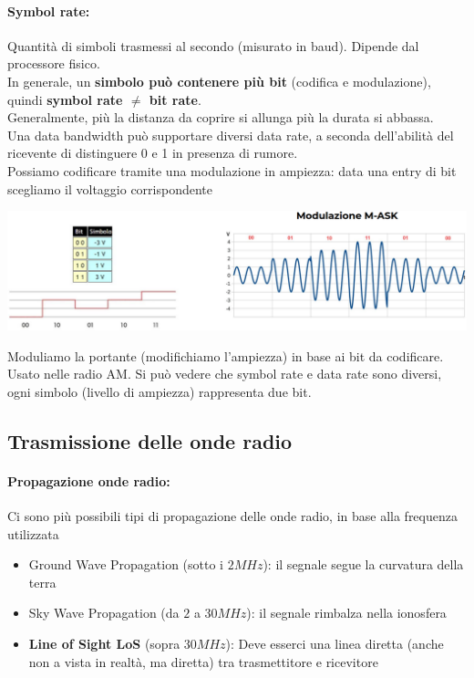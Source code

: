 \paragraph{Symbol rate:} Quantità di simboli trasmessi al secondo (misurato in baud). Dipende dal processore fisico.\\

In generale, un \textbf{simbolo può contenere più bit} (codifica e modulazione), quindi \textbf{symbol rate $\neq$ bit rate}.\\
Generalmente, più la distanza da coprire si allunga più la durata si abbassa.\\

Una data bandwidth può supportare diversi data rate, a seconda dell'abilità del ricevente di distinguere 0 e 1 in presenza di rumore.\\

Possiamo codificare tramite una modulazione in ampiezza: data una entry di bit scegliamo il voltaggio corrispondente
\begin{center}
	\includegraphics[width=\linewidth]{img/wireless/modam1}
\end{center}
Moduliamo la portante (modifichiamo l'ampiezza) in base ai bit da codificare. Usato nelle radio AM. Si può vedere che symbol rate e data rate sono diversi, ogni simbolo (livello di ampiezza) rappresenta due bit.\\

\newpage

\subsection{Trasmissione delle onde radio}

\paragraph{Propagazione onde radio:} Ci sono più possibili tipi di propagazione delle onde radio, in base alla frequenza utilizzata
\begin{itemize}
	\item Ground Wave Propagation (sotto i $2MHz$): il segnale segue la curvatura della terra
	\item Sky Wave Propagation (da $2$ a $30MHz$): il segnale rimbalza nella ionosfera
	\item \textbf{Line of Sight LoS} (sopra $30MHz$): Deve esserci una linea diretta (anche non a vista in realtà, ma diretta) tra trasmettitore e ricevitore
\end{itemize}

